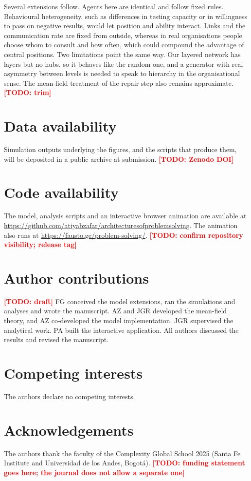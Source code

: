 \documentclass[11pt]{article}
\newcommand{\todo}[1]{\textcolor{red}{\textbf{[TODO: #1]}}}
\begin{document}
Several extensions follow. Agents here are identical and follow fixed rules. Behavioural heterogeneity, such as differences in testing capacity or in willingness to pass on negative results, would let position and ability interact. Links and the communication rate are fixed from outside, whereas in real organisations people choose whom to consult and how often, which could compound the advantage of central positions. Two limitations point the same way. Our layered network has layers but no hubs, so it behaves like the random one, and a generator with real asymmetry between levels is needed to speak to hierarchy in the organisational sense. The mean-field treatment of the repair step also remains approximate. \todo{trim}


\section*{Data availability}
Simulation outputs underlying the figures, and the scripts that produce them, will be deposited in a public archive at submission. \todo{Zenodo DOI}

\section*{Code availability}
The model, analysis scripts and an interactive browser animation are available at \url{https://github.com/atiyabzafar/architecturesofproblemsolving}. The animation also runs at \url{https://fausto.ge/problem-solving/}. \todo{confirm repository visibility; release tag}

\section*{Author contributions}
\todo{draft} FG conceived the model extensions, ran the simulations and analyses and wrote the manuscript. AZ and JGR developed the mean-field theory, and AZ co-developed the model implementation. JGR supervised the analytical work. PA built the interactive application. All authors discussed the results and revised the manuscript.

\section*{Competing interests}
The authors declare no competing interests.

\section*{Acknowledgements}
The authors thank the faculty of the Complexity Global School 2025 (Santa Fe Institute and Universidad de los Andes, Bogot\'a). \todo{funding statement goes here; the journal does not allow a separate one}
\end{document}
